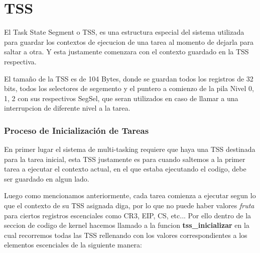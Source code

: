 \section{TSS}
\par{El Task State Segment o TSS, es una estructura especial del sistema utilizada para guardar los contextos de ejecucion de una tarea al momento de dejarla para saltar a otra. Y esta justamente comenzara con el contexto guardado en la TSS respectiva.}
\par{ El tamaño de la TSS es de 104 Bytes, donde se guardan todos los registros de 32 bits, todos los selectores de segemento y el puntero a comienzo de la pila Nivel 0, 1, 2 con sus respectivos SegSel, que seran utilizados en caso de llamar a una interrupcion de diferente nivel a la tarea.}

\subsubsection*{Proceso de Inicialización de Tareas}
\par{En primer lugar el sistema de multi-tasking requiere que haya una TSS destinada para la tarea inicial, esta TSS justamente es para cuando saltemos a la primer tarea a ejecutar el contexto actual, en el que estaba ejecutando el codigo, debe ser guardado en algun lado.}
\par{Luego como mencionamos anteriormente, cada tarea comienza a ejecutar segun lo que el contexto de su TSS asignada diga, por lo que no puede haber valores \textsl{fruta} para ciertos registros escenciales como CR3, EIP, CS, etc... Por ello dentro de la seccion de codigo de kernel hacemos llamado a la funcion \textbf{tss\_inicializar} en la cual recorremos todas las TSS rellenando con los valores correspondientes a los elementos escenciales de la siguiente manera:  }

